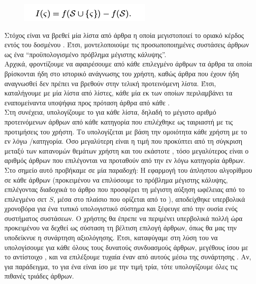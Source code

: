 {{{{{{{{\begin{figure}[!ht] \centering
    \includegraphics[scale=0.7]{static/figures/increase.png}
    \label{}
\end{figure} 

Στόχος είναι να βρεθεί μία λίστα από άρθρα η οποία μεγιστοποιεί το οριακό κέρδος εντός του δοσμένου {}.
Έτσι, μοντελοποιούμε τις προσωποποιημένες συστάσεις άρθρων ως ένα “προϋπολογισμένο πρόβλημα μέγιστης κάλυψης”. \\

Αρχικά, φροντίζουμε να αφαιρέσουμε από κάθε επιλεγμένο {} άρθρων τα άρθρα τα οποία βρίσκονται ήδη 
στο ιστορικό ανάγνωσης του χρήστη, καθώς άρθρα που έχουν ήδη αναγνωσθεί δεν πρέπει να βρεθούν στην τελική προτεινόμενη λίστα. 
Έτσι, καταλήγουμε με μία λίστα από λίστες, κάθε μία εκ των οποίων περιλαμβάνει 
τα εναπομείναντα υποψήφια προς πρόταση άρθρα από κάθε {}. \\
Στη συνέχεια, υπολογίζουμε το {} για κάθε λίστα, 
δηλαδή το μέγιστο αριθμό προτεινόμενων άρθρων από κάθε κατηγορία που επιλέχθηκε ως ταιριαστή με τις προτιμήσεις του χρήστη. 
Το {} υπολογίζεται με βάση την ομοιότητα κάθε χρήστη με το εν λόγω {}/κατηγορία. 
Όσο μεγαλύτερη είναι η τιμή που προκύπτει από τη σύγκριση μεταξύ των κατανομών θεμάτων χρήστη και του εκάστοτε {}, 
τόσο μεγαλύτερος είναι ο αριθμός άρθρων που επιλέγονται να προταθούν από την εν λόγω κατηγορία άρθρων. \\
Στο σημείο αυτό προβήκαμε σε μία παραδοχή:  
Η εφαρμογή του άπληστου αλγορίθμου {} σε κάθε {} άρθρων (προκειμένου να επιλύσουμε 
το πρόβλημα μέγιστης κάλυψης, επιλέγοντας διαδοχικά το άρθρο που προσφέρει τη μέγιστη αύξηση ωφέλειας από το επιλεγμένο σετ $S$, 
μέσα στο πλαίσιο που ορίζεται από το {}), αποδείχθηκε υπερβολικά χρονοβόρα για ένα τυπικό υπολογιστικό σύστημα 
και ξέφευγε από την ουσία ενός συστήματος συστάσεων. 
Ο χρήστης θα έπρεπε να περιμένει υπερβολικά πολλή ώρα προκειμένου να δεχθεί ως σύσταση τη βέλτιση επιλογή άρθρων, 
όπως θα μας την υποδείκνυε η συνάρτηση αξιολόγησης.
Έτσι, καταφύγαμε στη λύση του να υπολογίσουμε για κάθε {} όλους τους δυνατούς συνδυασμούς άρθρων, μεγέθους ίσου με το αντίστοιχο {}, 
και να επιλέξουμε τυχαία έναν από αυτούς μέσω της συνάρτησης {}.
Αν, για παράδειγμα, το {} για ένα {} είναι ίσο με την τιμή τρία, τότε υπολογίζουμε όλες τις πιθανές τριάδες άρθρων. \\
}}}}}}}}
